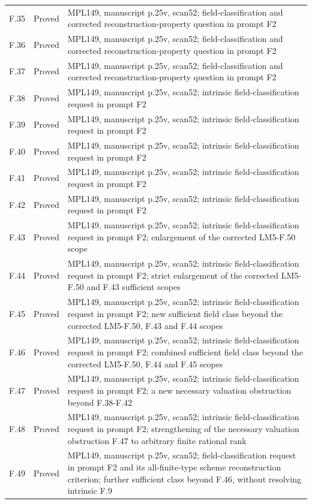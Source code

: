 {\begin{longtable}{p{1.9cm}p{1.7cm}p{10.3cm}}
F.35 & Proved & MPL149, manuscript p.25v, scan52; field-classification and corrected reconstruction-property question in prompt F2 \\
F.36 & Proved & MPL149, manuscript p.25v, scan52; field-classification and corrected reconstruction-property question in prompt F2 \\
F.37 & Proved & MPL149, manuscript p.25v, scan52; field-classification and corrected reconstruction-property question in prompt F2 \\
F.38 & Proved & MPL149, manuscript p.25v, scan52; intrinsic field-classification request in prompt F2 \\
F.39 & Proved & MPL149, manuscript p.25v, scan52; intrinsic field-classification request in prompt F2 \\
F.40 & Proved & MPL149, manuscript p.25v, scan52; intrinsic field-classification request in prompt F2 \\
F.41 & Proved & MPL149, manuscript p.25v, scan52; intrinsic field-classification request in prompt F2 \\
F.42 & Proved & MPL149, manuscript p.25v, scan52; intrinsic field-classification request in prompt F2 \\
F.43 & Proved & MPL149, manuscript p.25v, scan52; intrinsic field-classification request in prompt F2; enlargement of the corrected LM5-F.50 scope \\
F.44 & Proved & MPL149, manuscript p.25v, scan52; intrinsic field-classification request in prompt F2; strict enlargement of the corrected LM5-F.50 and F.43 sufficient scopes \\
F.45 & Proved & MPL149, manuscript p.25v, scan52; intrinsic field-classification request in prompt F2; new sufficient field class beyond the corrected LM5-F.50, F.43 and F.44 scopes \\
F.46 & Proved & MPL149, manuscript p.25v, scan52; intrinsic field-classification request in prompt F2; combined sufficient field class beyond the corrected LM5-F.50, F.44 and F.45 scopes \\
F.47 & Proved & MPL149, manuscript p.25v, scan52; intrinsic field-classification request in prompt F2; a new necessary valuation obstruction beyond F.38-F.42 \\
F.48 & Proved & MPL149, manuscript p.25v, scan52; intrinsic field-classification request in prompt F2; strengthening of the necessary valuation obstruction F.47 to arbitrary finite rational rank \\
F.49 & Proved & MPL149, manuscript p.25v, scan52; field-classification request in prompt F2 and its all-finite-type scheme reconstruction criterion; further sufficient class beyond F.46, without resolving intrinsic F.9 \\
\bottomrule\end{longtable}
}
